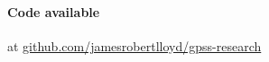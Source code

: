 \documentclass[landscape,a0b,final,a4resizeable]{a0poster}
\newenvironment{poster}{
  \begin{center}
  \begin{minipage}[c]{0.96\textwidth}
}{
  \end{minipage} 
  \end{center}
}
\begin{document}
\begin{poster}
\begin{multicols}{3}
\vspace{1\baselineskip}

\raggedright
\paragraph{Code available} at \url{github.com/jamesrobertlloyd/gpss-research}

\end{multicols}

\end{poster}
\end{document}
